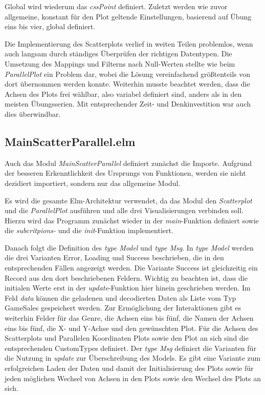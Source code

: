 \documentclass[usegeometry=true]{scrartcl}
\begin{document}
Global wird wiederum das \textit{cssPoint} definiert.
Zuletzt werden wie zuvor allgemeine, konstant für den Plot geltende Einstellungen, basierend auf Übung eins bis vier, global definiert. 

Die Implementierung des Scatterplots verlief in weiten Teilen problemlos, wenn auch langsam durch ständiges Überprüfen der richtigen Datentypen.
Die Umsetzung des Mappings und Filterns nach Null-Werten stellte wie beim \textit{ParallelPlot} ein Problem dar, wobei die Lösung vereinfachend größtenteils von dort übernommen werden konnte. 
Weiterhin musste beachtet werden, dass die Achsen des Plots frei wählbar, also variabel definiert sind, anders als in den meisten Übungsserien.
Mit entsprechender Zeit- und Denkinvestition war auch dies überwindbar.

\subsection{MainScatterParallel.elm}
Auch das Modul \textit{MainScatterParallel} definiert zunächst die Importe. 
Aufgrund der besseren Erkenntlichkeit des Ursprungs von Funktionen, werden sie nicht dezidiert importiert, sondern nur das allgemeine Modul. 

Es wird die gesamte Elm-Architektur verwendet, da das Modul den \textit{Scatterplot} und die \textit{ParallelPlot} ausführen und alle drei Visualisierungen verbinden soll.
Hierzu wird das Programm zunächst wieder in der \textit{main}-Funktion definiert sowie die \textit{subcritpions-} und die \textit{init}-Funktion implementiert.

Danach folgt die Definition des \textit{type Model} und \textit{type Msg}. 
In \textit{type Model} werden die drei Varianten Error, Loading und Success beschrieben, die in den entsprechenden Fällen angezeigt werden. 
Die Variante Success ist gleichzeitig ein Record aus den dort beschriebenen Feldern. 
Wichtig zu beachten ist, dass die initialen Werte erst in der \textit{update}-Funktion hier hinein geschrieben werden.
Im Feld \textit{data} können die geladenen und decodierten Daten als Liste vom Typ GameSales gespeichert werden. 
Zur Ermöglichung der Interaktionen gibt es weiterhin Felder für das Genre, die Achsen eins bis fünf, die Namen der Achsen eins bis fünf, die X- und Y-Achse und den gewünschten Plot. 
Für die Achsen des Scatterplots und Parallelen Koordinaten Plots sowie den Plot an sich sind die entsprechenden CustomTypes definiert.
Der \textit{type Msg} definiert die Varianten für die Nutzung in \textit{update} zur Überschreibung des Models. 
Es gibt eine Variante zum erfolgreichen Laden der Daten und damit der Initialisierung des Plots sowie für jeden möglichen Wechsel von Achsen in den Plots sowie den Wechsel des Plots an sich.
\end{document}
